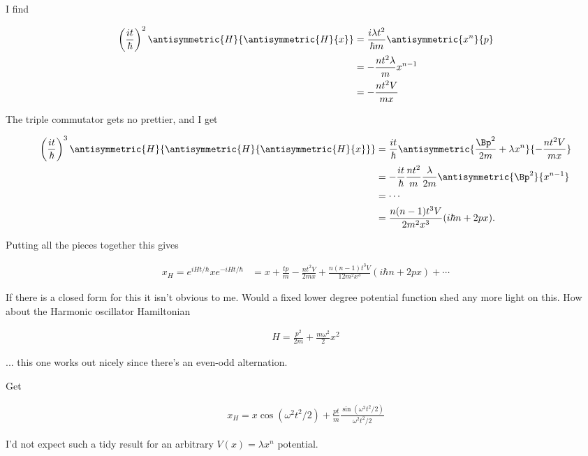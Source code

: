 I find 

\begin{align*}
\left( \frac{i t}{\hbar} \right)^2 \antisymmetric{H}{\antisymmetric{H}{x}} 
&= \frac{i \lambda t^2}{\hbar m } \antisymmetric{x^n}{p}  \\
&= - \frac{n t^2 \lambda}{m} x^{n-1} \\
&= - \frac{n t^2 V}{m x} \\
\end{align*}

The triple commutator gets no prettier, and I get

\begin{align*}
\left( \frac{i t}{\hbar} \right)^3 \antisymmetric{H}{\antisymmetric{H}{\antisymmetric{H}{x}}}
&= 
\frac{it}{\hbar} \antisymmetric{ \frac{\Bp^2}{2m} + \lambda x^n}{ - \frac{n t^2 V}{m x} } \\
&= 
-\frac{it}{\hbar} \frac{n t^2 }{m } \frac{\lambda}{2m} \antisymmetric{\Bp^2}{ x^{n-1}} \\
&= \cdots \\
&= \frac{n(n-1)t^3 V}{ 2 m^2 x^3 } (i \hbar n + 2 p x).
\end{align*}

Putting all the pieces together this gives

\begin{align}\label{eqn:desaiCh3:307}
x_H =
e^{iH t/\hbar} x e^{-iH t/\hbar}  &= 
x + \frac{tp}{m} - \frac{n t^2 V}{ 2 m x} 
+ \frac{n(n-1)t^3 V}{ 12 m^2 x^3 } (i \hbar n + 2 p x) + \cdots
\end{align}

If there is a closed form for this it isn't obvious to me.  Would a fixed lower degree potential function shed any more light on this.  How about the Harmonic oscillator Hamiltonian

\begin{align}\label{eqn:desaiCh3:308}
H = \frac{p^2}{2m} + \frac{m \omega^2 }{2} x^2
\end{align}

... this one works out nicely since there's an even-odd alternation.

Get

\begin{align}\label{eqn:desaiCh3:309}
x_H = x \cos (\omega^2 t^2 /2) + 
\frac{ p t }{m} \frac{\sin( \omega^2 t^2/2)}{ \omega^2 t^2/2 }
\end{align}

I'd not expect such a tidy result for an arbitrary $V(x) = \lambda x^n$ potential.

